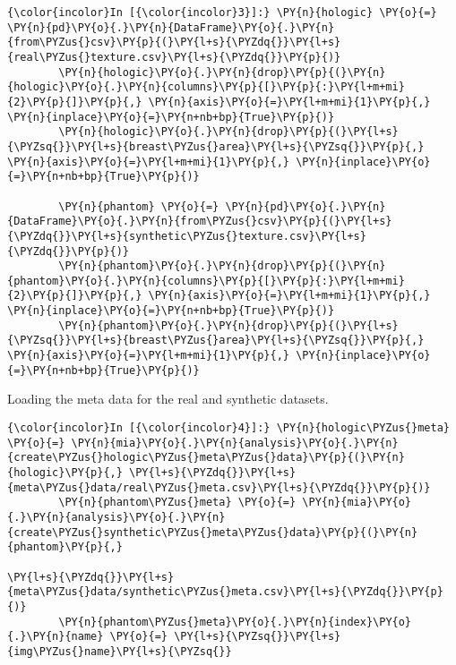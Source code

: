     \begin{Verbatim}[commandchars=\\\{\}]
{\color{incolor}In [{\color{incolor}3}]:} \PY{n}{hologic} \PY{o}{=} \PY{n}{pd}\PY{o}{.}\PY{n}{DataFrame}\PY{o}{.}\PY{n}{from\PYZus{}csv}\PY{p}{(}\PY{l+s}{\PYZdq{}}\PY{l+s}{real\PYZus{}texture.csv}\PY{l+s}{\PYZdq{}}\PY{p}{)}
        \PY{n}{hologic}\PY{o}{.}\PY{n}{drop}\PY{p}{(}\PY{n}{hologic}\PY{o}{.}\PY{n}{columns}\PY{p}{[}\PY{p}{:}\PY{l+m+mi}{2}\PY{p}{]}\PY{p}{,} \PY{n}{axis}\PY{o}{=}\PY{l+m+mi}{1}\PY{p}{,} \PY{n}{inplace}\PY{o}{=}\PY{n+nb+bp}{True}\PY{p}{)}
        \PY{n}{hologic}\PY{o}{.}\PY{n}{drop}\PY{p}{(}\PY{l+s}{\PYZsq{}}\PY{l+s}{breast\PYZus{}area}\PY{l+s}{\PYZsq{}}\PY{p}{,} \PY{n}{axis}\PY{o}{=}\PY{l+m+mi}{1}\PY{p}{,} \PY{n}{inplace}\PY{o}{=}\PY{n+nb+bp}{True}\PY{p}{)}

        \PY{n}{phantom} \PY{o}{=} \PY{n}{pd}\PY{o}{.}\PY{n}{DataFrame}\PY{o}{.}\PY{n}{from\PYZus{}csv}\PY{p}{(}\PY{l+s}{\PYZdq{}}\PY{l+s}{synthetic\PYZus{}texture.csv}\PY{l+s}{\PYZdq{}}\PY{p}{)}
        \PY{n}{phantom}\PY{o}{.}\PY{n}{drop}\PY{p}{(}\PY{n}{phantom}\PY{o}{.}\PY{n}{columns}\PY{p}{[}\PY{p}{:}\PY{l+m+mi}{2}\PY{p}{]}\PY{p}{,} \PY{n}{axis}\PY{o}{=}\PY{l+m+mi}{1}\PY{p}{,} \PY{n}{inplace}\PY{o}{=}\PY{n+nb+bp}{True}\PY{p}{)}
        \PY{n}{phantom}\PY{o}{.}\PY{n}{drop}\PY{p}{(}\PY{l+s}{\PYZsq{}}\PY{l+s}{breast\PYZus{}area}\PY{l+s}{\PYZsq{}}\PY{p}{,} \PY{n}{axis}\PY{o}{=}\PY{l+m+mi}{1}\PY{p}{,} \PY{n}{inplace}\PY{o}{=}\PY{n+nb+bp}{True}\PY{p}{)}
\end{Verbatim}

    Loading the meta data for the real and synthetic datasets.

    \begin{Verbatim}[commandchars=\\\{\}]
{\color{incolor}In [{\color{incolor}4}]:} \PY{n}{hologic\PYZus{}meta} \PY{o}{=} \PY{n}{mia}\PY{o}{.}\PY{n}{analysis}\PY{o}{.}\PY{n}{create\PYZus{}hologic\PYZus{}meta\PYZus{}data}\PY{p}{(}\PY{n}{hologic}\PY{p}{,} \PY{l+s}{\PYZdq{}}\PY{l+s}{meta\PYZus{}data/real\PYZus{}meta.csv}\PY{l+s}{\PYZdq{}}\PY{p}{)}
        \PY{n}{phantom\PYZus{}meta} \PY{o}{=} \PY{n}{mia}\PY{o}{.}\PY{n}{analysis}\PY{o}{.}\PY{n}{create\PYZus{}synthetic\PYZus{}meta\PYZus{}data}\PY{p}{(}\PY{n}{phantom}\PY{p}{,}
                                                               \PY{l+s}{\PYZdq{}}\PY{l+s}{meta\PYZus{}data/synthetic\PYZus{}meta.csv}\PY{l+s}{\PYZdq{}}\PY{p}{)}
        \PY{n}{phantom\PYZus{}meta}\PY{o}{.}\PY{n}{index}\PY{o}{.}\PY{n}{name} \PY{o}{=} \PY{l+s}{\PYZsq{}}\PY{l+s}{img\PYZus{}name}\PY{l+s}{\PYZsq{}}
\end{Verbatim}

